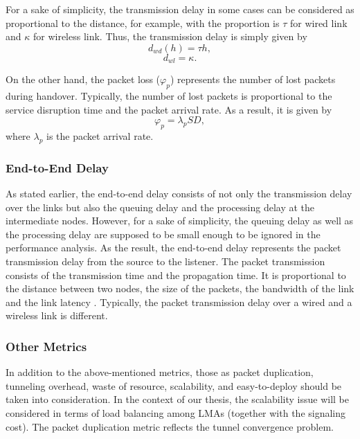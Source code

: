 For a sake of simplicity, the transmission delay in some cases can be considered as proportional to the distance, for example, with the proportion is $\tau$ for wired link and $\kappa$ for wireless link. Thus, the transmission delay is simply given by
\begin{equation}
d_{wd}(h) = \tau h,
\end{equation}
\begin{equation}
d_{wl} = \kappa.
\end{equation} 

On the other hand, the packet loss ($\varphi_{p}$) represents the number of lost packets during handover. Typically, the number of lost packets is proportional to the service disruption time and the packet arrival rate. As a result, it is given by
\begin{equation}
\varphi_{p} = \lambda_{p} SD,
\end{equation} 
where $\lambda_{p}$ is the packet arrival rate.

\subsubsection{End-to-End Delay}
As stated earlier, the end-to-end delay consists of not only the transmission delay over the links but also the queuing delay and the processing delay at the intermediate nodes. However, for a sake of simplicity, the queuing delay as well as the processing delay are supposed to be small enough to be ignored in the performance analysis. As the result, the end-to-end delay represents the packet transmission delay from the source to the listener. The packet transmission consists of the transmission time and the propagation time. It is proportional to the distance between two nodes, the size of the packets, the bandwidth of the link and the link latency \cite{packet_transmission_delay}. Typically, the packet transmission delay over a wired and a wireless link is different. 
\subsubsection{Other Metrics}
In addition to the above-mentioned metrics, those as packet duplication, tunneling overhead, waste of resource, scalability, and easy-to-deploy should be taken into consideration. In the context of our thesis, the scalability issue will be considered in terms of load balancing among LMAs (together with the signaling cost). The packet duplication metric reflects the tunnel convergence problem. 

